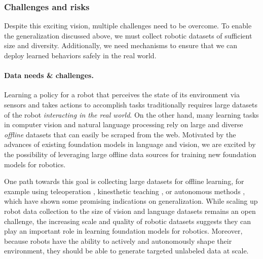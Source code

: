 \subsubsection{Challenges and risks}
\label{sec:robotics-challenges}

Despite this exciting vision, multiple challenges need to be overcome. To enable the generalization discussed above, we must collect robotic datasets of sufficient size and diversity. Additionally, we need mechanisms to ensure that we can deploy learned behaviors safely in the real world.

\paragraph{Data needs \& challenges.} Learning a policy for a robot that perceives the state of its environment via sensors and takes actions to accomplish tasks traditionally requires large datasets of the robot \textit{interacting in the real world}. On the other hand, many learning tasks in computer vision and natural language processing rely on large and diverse \emph{offline} datasets that can easily be scraped from the web. Motivated by the advances of existing foundation models in language and vision, we are excited by the possibility of leveraging large offline data sources for training new foundation models for robotics.

One path towards this goal is collecting large datasets for offline learning, for example using teleoperation \citep{mandelkar2019scaling}, kinesthetic teaching \citep{sharma2018mime}, or autonomous methods \citep{pinto2016supersizing, Gupta2018RobotLI, Levine2018LearningHC, dasari2019robonet, kalashnikov2021mt,chen2021batch}, which have shown some promising indications on generalization. While scaling up robot data collection to the size of vision and language datasets  \citep{deng2009imagenet, krishna2017visual, raffel2019exploring, gao2020pile} remains an open challenge, the increasing scale and quality of robotic datasets suggests they can play an important role in learning foundation models for robotics. Moreover, because robots have the ability to actively and autonomously shape their environment, they should be able to generate targeted unlabeled data at scale.

